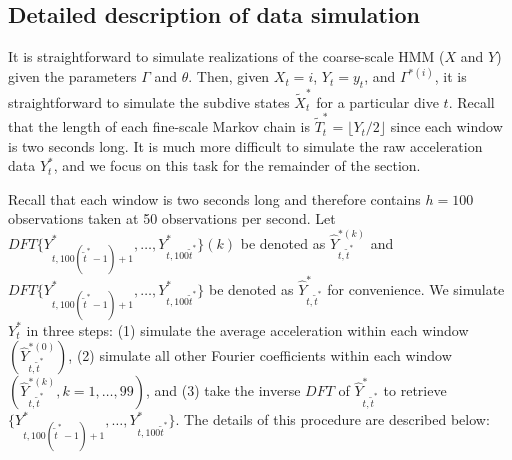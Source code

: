 
\subsection{Detailed description of data simulation}

It is straightforward to simulate realizations of the coarse-scale HMM ($X$ and $Y$) given the parameters $\Gamma$ and $\theta$. Then, given $X_t = i$, $Y_t = y_t$, and $\Gamma^{*(i)}$, it is straightforward to simulate the subdive states $\tilde{X}^*_t$ for a particular dive $t$. Recall that the length of each fine-scale Markov chain is $\tilde T^*_t = \lfloor Y_t/2 \rfloor$ since each window is two seconds long. It is much more difficult to simulate the raw acceleration data $Y_t^*$, and we focus on this task for the remainder of the section. 

Recall that each window is two seconds long and therefore contains $h = 100$ observations taken at 50 observations per second. Let $DFT\{Y^*_{t,100(\tilde t^* - 1) + 1},\ldots,Y^*_{t,100\tilde t^*}\}(k)$ be denoted as $\hat{Y}^{*(k)}_{t,\tilde t^*}$ and $DFT\{Y^*_{t,100(\tilde t^* - 1) + 1},\ldots,Y^*_{t,100\tilde t^*}\}$ be denoted as $\hat{Y}^*_{t,\tilde t^*}$ for convenience. We simulate $Y_t^*$ in three steps: (1) simulate the average acceleration within each window $\left(\hat Y^{*(0)}_{t,\tilde t^*}\right)$, (2) simulate all other Fourier coefficients within each window $\left(\hat Y^{*(k)}_{t,\tilde t^*}, k = 1,\ldots,99\right)$, and (3) take the inverse $DFT$ of $\hat{Y}^*_{t,\tilde t^*}$ to retrieve $\{Y^*_{t,100(\tilde t^* - 1) + 1},\ldots,Y^*_{t,100\tilde t^*}\}$. The details of this procedure are described below:

